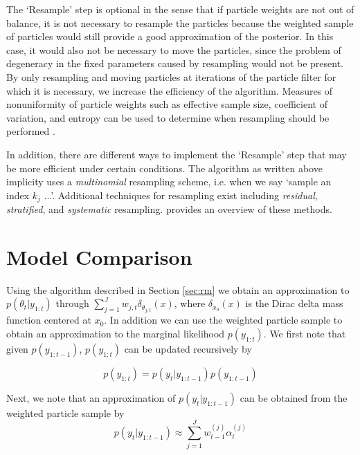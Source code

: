 \documentclass{article}
\begin{document}
The `Resample' step is optional in the sense that if particle weights are not out of balance, it is not necessary to resample the particles because the weighted sample of particles would still provide a good approximation of the posterior. In this case, it would also not be necessary to move the particles, since the problem of degeneracy in the fixed parameters caused by resampling would not be present. By only resampling and moving particles at iterations of the particle filter for which it is necessary, we increase the efficiency of the algorithm. Measures of nonuniformity of particle weights such as effective sample size, coefficient of variation, and entropy can be used to determine when resampling should be performed \citep{Liu:Chen:Wong:reje:1998}. %

In addition, there are different ways to implement the `Resample' step that may be more efficient under certain conditions. The algorithm as written above implicity uses a \emph{multinomial} resampling scheme, i.e. when we say `sample an index $k_j$ ...'. Additional techniques for resampling exist including \emph{residual}, \emph{stratified}, and \emph{systematic} resampling. \citet{Douc:Capp:Moul:comp:2005} provides an overview of these methods. %

\section{Model Comparison}

Using the algorithm described in Section \ref{sec:rm} we obtain an approximation to $p(\theta_t|y_{1:t})$ through $\sum_{j=1}^J w_{j,t}\delta_{\theta_{j,t}}(x)$, where $\delta_{x_0}(x)$ is the Dirac delta mass function centered at $x_0$. In addition we can use the weighted particle sample to obtain an approximation to the marginal likelihood $p(y_{1:t})$. We first note that given $p(y_{1:t-1})$, $p(y_{1:t})$ can be updated recursively by

\begin{equation}
p(y_{1:t}) = p(y_t|y_{1:t-1})p(y_{1:t-1}) \label{eqn:marglik}
\end{equation}

\noindent Next, we note that an approximation of $p(y_t|y_{1:t-1})$ can be obtained from the weighted particle sample by
\begin{equation}
p(y_t|y_{1:t-1}) \approx \sum_{j=1}^J w^{(j)}_{t-1}\alpha^{(j)}_t \label{eqn:condmarg}
\end{equation}
\end{document}
